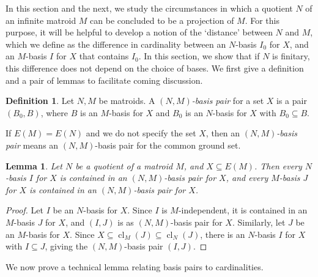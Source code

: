 \documentclass{amsart}
\theoremstyle{plain}
\newtheorem{lemma}[theorem]{Lemma}
\newcounter{defn}
\theoremstyle{definition}
\newtheorem{definition}[defn]{Definition}
\DeclareMathOperator{\cl}{cl}
\renewcommand{\ss}{\subseteq}
\begin{document}
In this section and the next, we study the circumstances in which a quotient $N$ of an 
infinite matroid $M$ can be concluded to be a projection of $M$. 
For this purpose, it will be helpful to develop a notion of the `distance' between $N$ and $M$, 
which we define as the difference in cardinality
between an $N$-basis $I_0$ for $X$, and an $M$-basis $I$ for $X$ that contains $I_0$. 
In this section, we show that if $N$ is finitary, this difference does not depend on the choice of bases. 
We first give a definition and a pair of lemmas to facilitate coming discussion. 

\begin{definition}
  Let $N,M$ be matroids. A \emph{$(N,M)$-basis pair} for a set $X$ is a pair 
  $(B_0,B)$, where $B$ is an $M$-basis for $X$ and $B_0$ is an $N$-basis for $X$ with $B_0 \ss B$.  
\end{definition}

If $E(M) = E(N)$ and we do not specify the set $X$, then an \emph{$(N,M)$-basis pair} means an $(N,M)$-basis pair 
for the common ground set. 

\begin{lemma}
  Let $N$ be a quotient of a matroid $M$, and $X \ss E(M)$. Then every $N$-basis $I$ for $X$ 
  is contained in an $(N,M)$-basis pair for $X$, and every $M$-basis $J$ for $X$ is contained
  in an $(N,M)$-basis pair for $X$. 
\end{lemma}
\begin{proof}
  Let $I$ be an $N$-basis for $X$. Since $I$ is $M$-independent, it is contained in an $M$-basis $J$ for $X$, 
  and $(I,J)$ is as $(N,M)$-basis pair for $X$. 
  Similarly, let $J$ be an $M$-basis for $X$. Since $X \ss \cl_M(J) \ss \cl_N(J)$, there is an $N$-basis $I$ for $X$ with $I \ss J$, 
  giving the $(N,M)$-basis pair $(I,J)$. 
\end{proof}

We now prove a technical lemma relating basis pairs to cardinalities. 
\end{document}
